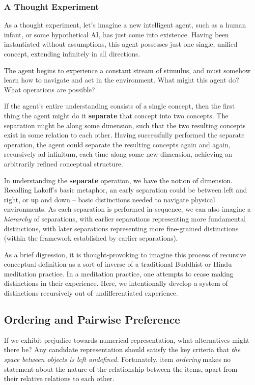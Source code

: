 \subsubsection{A Thought Experiment}

As a thought experiment, let's imagine a new intelligent agent, such as a human infant, or some hypothetical AI, has just come into existence.
Having been instantiated without assumptions, this agent possesses just one single, unified concept, extending infinitely in all directions.

The agent begins to experience a constant stream of stimulus, and must somehow learn how to navigate and act in the environment. What might this agent do? What operations are possible?

If the agent's entire understanding consists of a single concept, then the first thing the agent might do it \textbf{separate} that concept into two concepts.
The separation might be along some dimension, such that the two resulting concepts exist in some relation to each other.
Having successfully performed the separate operation, the agent could separate the resulting concepts again and again, recursively ad infinitum, each time along some new dimension, achieving an arbitrarily refined conceptual structure.

In understanding the \textbf{separate} operation, we have the notion of dimension.
Recalling Lakoff's basic metaphor, an early separation could be between left and right, or up and down -- basic distinctions needed to navigate physical environments.
As each separation is performed in sequence, we can also imagine a \textit{hierarchy} of separations, with earlier separations representing more fundamental distinctions, with later separations representing more fine-grained distinctions (within the framework established by earlier separations).

As a brief digression, it is thought-provoking to imagine this process of recursive conceptual definition as a sort of inverse of a traditional Buddhist or Hindu meditation practice.
In a meditation practice, one attempts to cease making distinctions in their experience. Here, we intentionally develop a system of distinctions recursively out of undifferentiated experience.


\subsection{Ordering and Pairwise Preference}

If we exhibit prejudice towards numerical representation, what alternatives might there be? Any candidate representation should satisfy the key criteria that \textit{the space between objects is left undefined.
}
Fortunately, item \textit{ordering} makes no statement about the nature of the relationship between the items, apart from their relative relations to each other.

